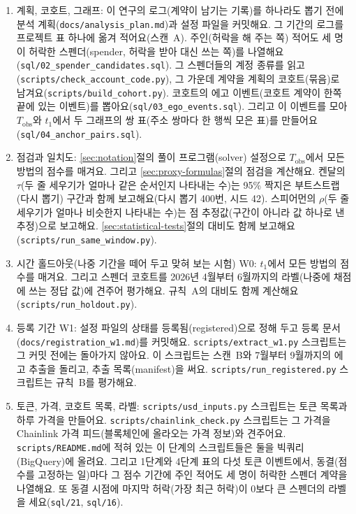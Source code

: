 \begin{enumerate}
\item 계획, 코호트, 그래프: 이 연구의 로그(계약이 남기는 기록)를 하나라도 뽑기 전에 분석 계획(\texttt{docs/analysis\_plan.md})과 설정 파일을 커밋해요. 그 기간의 로그를 프로젝트 표 하나에 옮겨 적어요(스캔~A). 주인(허락을 해 주는 쪽) 적어도 세 명이 허락한 스펜더(spender, 허락을 받아 대신 쓰는 쪽)를 나열해요(\texttt{sql/02\_spender\_candidates.sql}). 그 스펜더들의 계정 종류를 읽고(\texttt{scripts/check\_account\_code.py}), 그 가운데 계약을 계획의 코호트(묶음)로 남겨요(\texttt{scripts/build\_cohort.py}). 코호트의 에고 이벤트(코호트 계약이 한쪽 끝에 있는 이벤트)를 뽑아요(\texttt{sql/03\_ego\_events.sql}). 그리고 이 이벤트를 모아 $T_{\mathrm{obs}}$와 $t_1$에서 두 그래프의 쌍 표(주소 쌍마다 한 행씩 모은 표)를 만들어요(\texttt{sql/04\_anchor\_pairs.sql}).
\item 점검과 일치도: \ref{sec:notation}절의 풀이 프로그램(solver) 설정으로 $T_{\mathrm{obs}}$에서 모든 방법의 점수를 매겨요. 그리고 \ref{sec:proxy-formulas}절의 점검을 계산해요. 켄달의 $\tau$(두 줄 세우기가 얼마나 같은 순서인지 나타내는 수)는 95\% 짝지은 부트스트랩(다시 뽑기) 구간과 함께 보고해요(다시 뽑기 400번, 시드 42). 스피어먼의 $\rho$(두 줄 세우기가 얼마나 비슷한지 나타내는 수)는 점 추정값(구간이 아니라 값 하나로 낸 추정)으로 보고해요. \ref{sec:statistical-tests}절의 대비도 함께 보고해요(\texttt{scripts/run\_same\_window.py}).
\item 시간 홀드아웃(나중 기간을 떼어 두고 맞혀 보는 시험) W0: $t_1$에서 모든 방법의 점수를 매겨요. 그리고 스펜더 코호트를 2026년 4월부터 6월까지의 라벨(나중에 채점에 쓰는 정답 값)에 견주어 평가해요. 규칙~A의 대비도 함께 계산해요(\texttt{scripts/run\_holdout.py}).
\item 등록 기간 W1: 설정 파일의 상태를 등록됨(registered)으로 정해 두고 등록 문서(\texttt{docs/registration\_w1.md})를 커밋해요. \texttt{scripts/extract\_w1.py} 스크립트는 그 커밋 전에는 돌아가지 않아요. 이 스크립트는 스캔~B와 7월부터 9월까지의 에고 추출을 돌리고, 추출 목록(manifest)을 써요. \texttt{scripts/run\_registered.py} 스크립트는 규칙~B를 평가해요.
\item 토큰, 가격, 코호트 목록, 라벨: \texttt{scripts/usd\_inputs.py} 스크립트는 토큰 목록과 하루 가격을 만들어요. \texttt{scripts/chainlink\_check.py} 스크립트는 그 가격을 Chainlink 가격 피드(블록체인에 올라오는 가격 정보)와 견주어요. \texttt{scripts/README.md}에 적혀 있는 이 단계의 스크립트들은 둘을 빅쿼리(BigQuery)에 올려요. 그리고 1단계와 4단계 표의 다섯 토큰 이벤트에서, 동결(점수를 고정하는 일)마다 그 점수 기간에 주인 적어도 세 명이 허락한 스펜더 계약을 나열해요. 또 동결 시점에 마지막 허락(가장 최근 허락)이 0보다 큰 스펜더의 라벨을 세요(\texttt{sql/21}, \texttt{sql/16}).

\end{enumerate}
